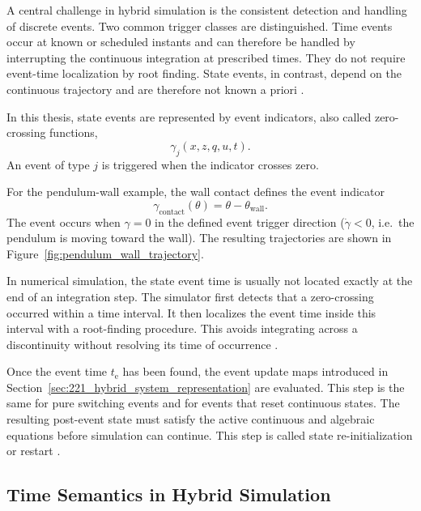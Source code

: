 A central challenge in hybrid simulation is the consistent detection and handling of discrete events.
Two common trigger classes are distinguished.
Time events occur at known or scheduled instants and can therefore be handled by interrupting the continuous integration at prescribed times.
They do not require event-time localization by root finding.
State events, in contrast, depend on the continuous trajectory and are therefore not known a priori \cite{cellier_combined_1986,branicky_general_1995}.

In this thesis, state events are represented by event indicators, also called zero-crossing functions,
\begin{equation}
    \gamma_j\!\left(x, z, q, u, t\right).
\end{equation}
An event of type $j$ is triggered when the indicator crosses zero.

For the pendulum-wall example, the wall contact defines the event indicator
\begin{equation}
    \gamma_\text{contact}(\theta) = \theta - \theta_\text{wall}.
\end{equation}
The event occurs when $\gamma = 0$ in the defined event trigger direction
($\dot{\gamma} < 0$, i.e.\ the pendulum is moving toward the wall).
The resulting trajectories are shown in Figure~\ref{fig:pendulum_wall_trajectory}.

In numerical simulation, the state event time is usually not located exactly at the end of an integration step.
The simulator first detects that a zero-crossing occurred within a time interval.
It then localizes the event time inside this interval with a root-finding procedure.
This avoids integrating across a discontinuity without resolving its time of occurrence \cite{andersson_omola_1990,cellier_combined_1986}.

Once the event time $t_\mathrm{e}$ has been found, the event update maps introduced in Section~\ref{sec:221_hybrid_system_representation} are evaluated.
This step is the same for pure switching events and for events that reset continuous states.
The resulting post-event state must satisfy the active continuous and algebraic equations before simulation can continue.
This step is called state re-initialization or restart \cite{andersson_omola_1990,urquia_moraleda_modeling_2018}.

\subsection{Time Semantics in Hybrid Simulation}
\label{sec:223_hybrid_time_semantics}

